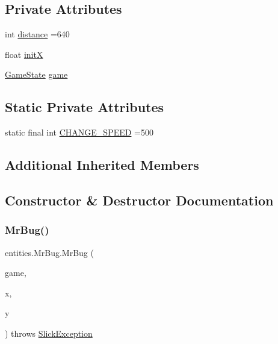 \subsection*{Private Attributes}
\begin{DoxyCompactItemize}
\item 
int \mbox{\hyperlink{classentities_1_1_mr_bug_ac1294909619da53941cf37073936daba}{distance}} =640
\item 
float \mbox{\hyperlink{classentities_1_1_mr_bug_ab378361709f903878b74eb06b4d84229}{initX}}
\item 
\mbox{\hyperlink{classstates_1_1_game_state}{Game\+State}} \mbox{\hyperlink{classentities_1_1_mr_bug_a02458a7ed258fc3f99a097cf95bc036e}{game}}
\end{DoxyCompactItemize}
\subsection*{Static Private Attributes}
\begin{DoxyCompactItemize}
\item 
static final int \mbox{\hyperlink{classentities_1_1_mr_bug_aa5df4742960ee351c233d37596d7c5de}{C\+H\+A\+N\+G\+E\+\_\+\+S\+P\+E\+ED}} =500
\end{DoxyCompactItemize}
\subsection*{Additional Inherited Members}


\subsection{Constructor \& Destructor Documentation}
\mbox{\label{classentities_1_1_mr_bug_a4f6f4739261744b12cd363b92b8819c6}} 
\subsubsection{\texorpdfstring{Mr\+Bug()}{MrBug()}}
{\footnotesize\ttfamily entities.\+Mr\+Bug.\+Mr\+Bug (\begin{DoxyParamCaption}\item[{\mbox{\hyperlink{classstates_1_1_game_state}{Game\+State}}}]{game,  }\item[{float}]{x,  }\item[{float}]{y }\end{DoxyParamCaption}) throws \mbox{\hyperlink{classorg_1_1newdawn_1_1slick_1_1_slick_exception}{Slick\+Exception}}\hspace{0.3cm}{\ttfamily [inline]}}


